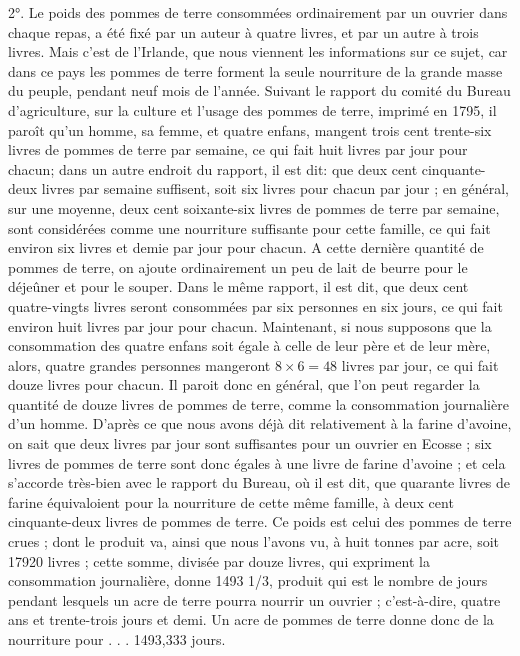 2°. Le poids des pommes de terre consommées ordinairement par un ouvrier dans chaque repas, a été fixé par un auteur à quatre livres, et par un autre à trois livres. Mais c'est de l'Irlande, que nous viennent les informations sur ce sujet, car dans ce pays les pommes de terre forment la seule nourriture de la grande masse du peuple, pendant neuf mois de l'année. Suivant le rapport du comité du Bureau d'agriculture, sur la culture et l'usage des pommes de terre, imprimé en 1795, il paroît qu'un homme, sa femme, et quatre enfans, mangent trois cent trente-six livres de pommes de terre par semaine, ce qui fait huit livres par jour pour chacun; dans un autre endroit du rapport, il est dit: que deux cent cinquante-deux livres par semaine suffisent, soit six livres pour chacun\setcounter{page}{360} par jour ; en général, sur une moyenne, deux cent soixante-six livres de pommes de terre par semaine, sont considérées comme une nourriture suffisante pour cette famille, ce qui fait environ six livres et demie par jour pour chacun. A cette dernière quantité de pommes de terre, on ajoute ordinairement un peu de lait de beurre pour le déjeûner et pour le souper. Dans le même rapport, il est dit, que deux cent quatre-vingts livres seront consommées par six personnes en six jours, ce qui fait environ huit livres par jour pour chacun. Maintenant, si nous supposons que la consommation des quatre enfans soit égale à celle de leur père et de leur mère, alors, quatre grandes personnes mangeront $8 \times 6 = 48$ livres par jour, ce qui fait douze livres pour chacun. Il paroit donc en général, que l'on peut regarder la quantité de douze livres de pommes de terre, comme la consommation journalière d'un homme. D'après ce que nous avons déjà dit relativement à la farine d'avoine, on sait que deux livres par jour sont suffisantes pour un ouvrier en Ecosse ; six livres de pommes de terre sont donc égales à une livre de farine d'avoine ; et cela s'accorde très-bien avec le rapport du Bureau, où il est dit, que quarante livres de farine équivaloient pour la nourriture de cette même\setcounter{page}{361} famille, à deux cent cinquante-deux livres de pommes de terre.
Ce poids est celui des pommes de terre crues ; dont le produit va, ainsi que nous l'avons vu, à huit tonnes par acre, soit 17920 livres ; cette somme, divisée par douze livres, qui expriment la consommation journalière, donne 1493 1/3, produit qui est le nombre de jours pendant lesquels un acre de terre pourra nourrir un ouvrier ; c'est-à-dire, quatre ans et trente-trois jours et demi. Un acre de pommes de terre
donne donc de la nourriture pour . . . 1493,333 jours.
